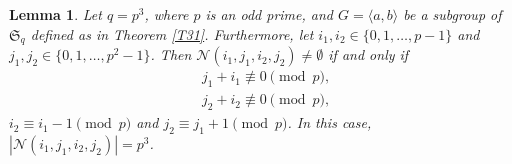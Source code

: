 \documentclass[11pt]{amsart}
\theoremstyle{plain}
\newtheorem{lem}[thm]{Lemma}
\numberwithin{equation}{section}
\begin{document}
\begin{lem}\label{Atleast_lemma_T31}
Let $q=p^3$, where $p$ is an odd prime, and $G=\langle a,b \rangle$ be a subgroup of $\mathfrak{S}_q$ defined as in Theorem \ref{T31}. Furthermore,  let $i_1,i_2 \in \{0,1,\ldots,p-1\}$ and $j_1,j_2 \in \{0,1,\ldots,p^{2}-1\}$. Then $\mathcal{N}(i_1,j_1,i_2,j_2) \neq \emptyset$ if and only if 
\begin{equation*}
\begin{split}
& j_1+i_1 \not \equiv  0  \pmod  p,\\& 
  j_2+i_2 \not \equiv  0 \pmod  p,
\end{split}
\end{equation*}
 $i_2\equiv i_1-1 \pmod  p$ and $j_2 \equiv j_1+1 \pmod  p$. In this case,  $|\mathcal{N}(i_1,j_1,i_2,j_2)|=p^3$.
\end{lem}
\end{document}
